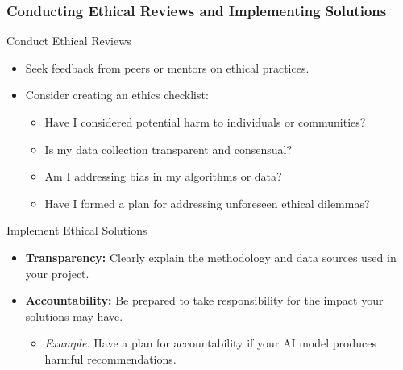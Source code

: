 \documentclass{beamer}
\begin{document}
\begin{frame}[fragile]
    \frametitle{Conducting Ethical Reviews and Implementing Solutions}
    \begin{block}{Conduct Ethical Reviews}
        \begin{itemize}
            \item Seek feedback from peers or mentors on ethical practices.
            \item Consider creating an ethics checklist:
                \begin{itemize}
                    \item Have I considered potential harm to individuals or communities?
                    \item Is my data collection transparent and consensual?
                    \item Am I addressing bias in my algorithms or data?
                    \item Have I formed a plan for addressing unforeseen ethical dilemmas?
                \end{itemize}
        \end{itemize}
    \end{block}

    \begin{block}{Implement Ethical Solutions}
        \begin{itemize}
            \item \textbf{Transparency:} Clearly explain the methodology and data sources used in your project.
            \item \textbf{Accountability:} Be prepared to take responsibility for the impact your solutions may have.
                \begin{itemize}
                    \item \textit{Example:} Have a plan for accountability if your AI model produces harmful recommendations.
                \end{itemize}
        \end{itemize}
    \end{block}
\end{frame}
\end{document}
